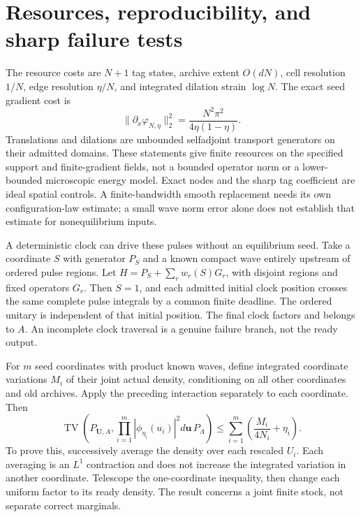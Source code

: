 \documentclass[11pt,oneside,openany]{book}
\theoremstyle{definition}
\theoremstyle{remark}\newtheorem{remark}[theorem]{Remark}
\begin{document}
\section{Resources, reproducibility, and sharp failure tests}

The resource costs are $N+1$ tag states, archive extent $O(dN)$,
cell resolution $1/N$, edge resolution $\eta/N$, and integrated
dilation strain $\log N$. The exact seed gradient cost is
\begin{equation}
 \|\partial_x\varphi_{N,\eta}\|_2^2
       =\frac{N^2\pi^2}{4\eta(1-\eta)}.
 \label{prep:seedcost}
\end{equation}
Translations and dilations are unbounded selfadjoint transport generators
on their admitted domains. These statements give finite resources on the
specified support and finite-gradient fields, not a bounded operator norm
or a lower-bounded microscopic energy model. Exact nodes and the sharp
tag coefficient are ideal spatial controls. A finite-bandwidth smooth
replacement needs its own configuration-law estimate; a small wave norm
error alone does not establish that estimate for nonequilibrium inputs.

A deterministic clock can drive these pulses without an equilibrium seed.
Take a coordinate $S$ with generator $P_S$ and a known compact wave
entirely upstream of ordered pulse regions. Let
$H=P_S+\sum_rw_r(S)G_r$, with disjoint regions and fixed operators $G_r$.
Then $\dot S=1$, and each admitted initial clock position crosses the
same complete pulse integrals by a common finite deadline. The ordered
unitary is independent of that initial position. The final clock factors
and belongs to $A$. An incomplete clock traversal is a genuine failure
branch, not the ready output.

For $m$ seed coordinates with product known waves, define integrated
coordinate variations $M_i$ of their joint actual density, conditioning
on all other coordinates and old archives. Apply the preceding interaction
separately to each coordinate. Then
\begin{equation}
 \operatorname{TV}\left(P_{\mathbf U,A},
       \prod_{i=1}^m|\phi_{\eta_i}(u_i)|^2d\mathbf u\,P_A\right)
 \le\sum_{i=1}^m\left(\frac{M_i}{4N_i}+\eta_i\right).
 \label{prep:stock}
\end{equation}
To prove this, successively average the density over each rescaled
$U_i$. Each averaging is an $L^1$ contraction and does not increase the
integrated variation in another coordinate. Telescope the one-coordinate
inequality, then change each uniform factor to its ready density.
The result concerns a joint finite stock, not separate correct marginals.
\end{document}
